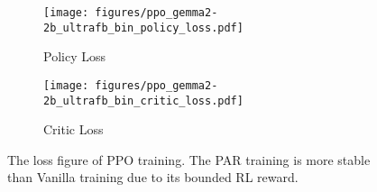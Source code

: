 \begin{figure}[htbp]
    \centering
    \begin{subfigure}[b]{0.48\textwidth} 
        \texttt{[image: figures/ppo\_gemma2-2b\_ultrafb\_bin\_policy\_loss.pdf]} 
        \caption{Policy Loss}
        \label{fig:figure1}
    \end{subfigure}
    \hfill 
    \begin{subfigure}[b]{0.48\textwidth} 
        \texttt{[image: figures/ppo\_gemma2-2b\_ultrafb\_bin\_critic\_loss.pdf]} 
        \caption{Critic Loss}
        \label{fig:figure2}
    \end{subfigure}
    \caption{The loss figure of PPO training. The PAR training is more stable than Vanilla training due to its bounded RL reward.}
    \label{fig:ppo_loss_figure}
\end{figure}